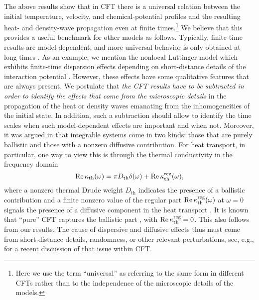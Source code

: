 \documentclass[12pt,a4paper]{article}
\theoremstyle{definition}
\theoremstyle{remark}
\begin{document}
The above results show that in CFT there is a universal
relation between the initial temperature, velocity, and chemical-potential
profiles and the resulting heat- and density-wave propagation even
at finite times.\footnote{Here we use the term ``universal'' as referring
to the same form in different CFTs rather than to the independence of
the microscopic details of the models.}
We believe that this provides a useful benchmark for other models as follows.
Typically, finite-time results are model-dependent, and more universal
behavior is only obtained at long times \cite{BeDo3}.
As an example, we mention the nonlocal Luttinger model which exhibits finite-time dispersion effects depending on short-distance details of the interaction potential \cite{LLMM2}.
However, these effects have some qualitative features that are always present.
We postulate that {\it the CFT results have to be subtracted in order
to identify the effects that come from the microscopic details} in the
propagation of the heat or density waves emanating from the inhomogeneities
of the initial state. In addition, such a subtraction should allow
to identify the time scales when such model-dependent effects
are important and when not.
Moreover, it was argued in \cite{Spo} that integrable systems come in two kinds: those that are purely ballistic and those with a nonzero diffusive contribution. For heat transport, in particular, one way to view this is through the thermal conductivity in the frequency domain
%
\begin{equation}
\label{Drude_def}
{\rm Re}\,\kappa_{\text{th}}(\omega) = \pi D_{\text{th}} \delta(\omega) +
{\rm Re}\,\kappa^{\text{reg}}_{\text{th}}(\omega),
\end{equation}
%
where a nonzero thermal Drude weight $D_{\text{th}}$ indicates the presence of a ballistic contribution and a finite nonzero value of the regular part
${\rm Re}\,\kappa^{\text{reg}}_{\text{th}}(\omega)$ at $\omega=0$
signals the presence of a diffusive component in the heat 
transport \cite{SPA1}.
It is known that ``pure'' CFT captures the ballistic part \cite{BeDo3},
with ${\rm Re}\,\kappa^{\text{reg}}_{\text{th}}=0$. This also follows from our results.
The cause of dispersive and diffusive effects thus must come from short-distance details, randomness, or other relevant perturbations, see, e.g., \cite{BeDo4} for a recent discussion of that issue within CFT.
\end{document}
